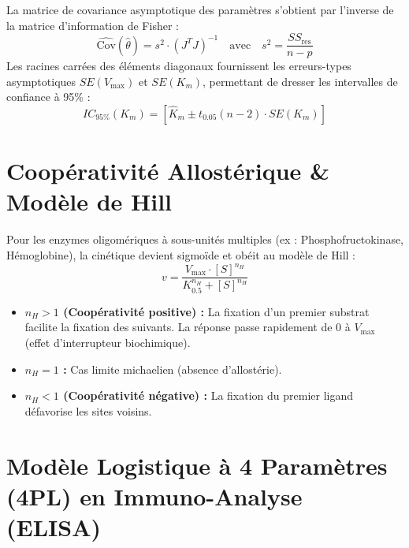 \documentclass[11pt,a4paper]{article}
\begin{document}
La matrice de covariance asymptotique des paramètres s'obtient par l'inverse de la matrice d'information de Fisher :
\begin{equation*}
  \widehat{\text{Cov}}(\hat{\theta}) = s^2 \cdot (J^T J)^{-1} \quad \text{avec} \quad s^2 = \frac{SS_{\text{res}}}{n - p}
\end{equation*}
Les racines carrées des éléments diagonaux fournissent les erreurs-types asymptotiques $SE(V_{\max})$ et $SE(K_m)$, permettant de dresser les intervalles de confiance à 95\% :
\begin{equation*}
  IC_{95\%}(K_m) = \left[ \hat{K}_m \pm t_{0.05}(n - 2) \cdot SE(K_m) \right]
\end{equation*}

\section{Coopérativité Allostérique \& Modèle de Hill}

Pour les enzymes oligomériques à sous-unités multiples (ex : Phosphofructokinase, Hémoglobine), la cinétique devient sigmoïde et obéit au modèle de Hill :
\begin{equation*}
  v = \frac{V_{\max} \cdot [S]^{n_H}}{K_{0.5}^{n_H} + [S]^{n_H}}
\end{equation*}
\begin{itemize}[leftmargin=*, label=\faAngleRight]
  \item \textbf{$n_H > 1$ (Coopérativité positive) :} La fixation d'un premier substrat facilite la fixation des suivants. La réponse passe rapidement de 0 à $V_{\max}$ (effet d'interrupteur biochimique).
  \item \textbf{$n_H = 1$ :} Cas limite michaelien (absence d'allostérie).
  \item \textbf{$n_H < 1$ (Coopérativité négative) :} La fixation du premier ligand défavorise les sites voisins.
\end{itemize}

\section{Modèle Logistique à 4 Paramètres (4PL) en Immuno-Analyse (ELISA)}
\end{document}

